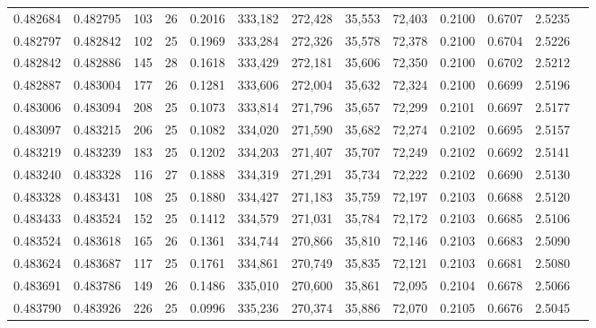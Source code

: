 \begin{tabular}{rrrrrrrrrrrrr}
0.482684 & 0.482795 & 103 &  26 &                                     0.2016 & 333,182 & 272,428 &  35,553 &  72,403 & 0.2100 & 0.6707 & 2.5235 \\
0.482797 & 0.482842 & 102 &  25 &                                     0.1969 & 333,284 & 272,326 &  35,578 &  72,378 & 0.2100 & 0.6704 & 2.5226 \\
0.482842 & 0.482886 & 145 &  28 &                                     0.1618 & 333,429 & 272,181 &  35,606 &  72,350 & 0.2100 & 0.6702 & 2.5212 \\
0.482887 & 0.483004 & 177 &  26 &                                     0.1281 & 333,606 & 272,004 &  35,632 &  72,324 & 0.2100 & 0.6699 & 2.5196 \\
0.483006 & 0.483094 & 208 &  25 &                                     0.1073 & 333,814 & 271,796 &  35,657 &  72,299 & 0.2101 & 0.6697 & 2.5177 \\
0.483097 & 0.483215 & 206 &  25 &                                     0.1082 & 334,020 & 271,590 &  35,682 &  72,274 & 0.2102 & 0.6695 & 2.5157 \\
0.483219 & 0.483239 & 183 &  25 &                                     0.1202 & 334,203 & 271,407 &  35,707 &  72,249 & 0.2102 & 0.6692 & 2.5141 \\
0.483240 & 0.483328 & 116 &  27 &                                     0.1888 & 334,319 & 271,291 &  35,734 &  72,222 & 0.2102 & 0.6690 & 2.5130 \\
0.483328 & 0.483431 & 108 &  25 &                                     0.1880 & 334,427 & 271,183 &  35,759 &  72,197 & 0.2103 & 0.6688 & 2.5120 \\
0.483433 & 0.483524 & 152 &  25 &                                     0.1412 & 334,579 & 271,031 &  35,784 &  72,172 & 0.2103 & 0.6685 & 2.5106 \\
0.483524 & 0.483618 & 165 &  26 &                                     0.1361 & 334,744 & 270,866 &  35,810 &  72,146 & 0.2103 & 0.6683 & 2.5090 \\
0.483624 & 0.483687 & 117 &  25 &                                     0.1761 & 334,861 & 270,749 &  35,835 &  72,121 & 0.2103 & 0.6681 & 2.5080 \\
0.483691 & 0.483786 & 149 &  26 &                                     0.1486 & 335,010 & 270,600 &  35,861 &  72,095 & 0.2104 & 0.6678 & 2.5066 \\
0.483790 & 0.483926 & 226 &  25 &                                     0.0996 & 335,236 & 270,374 &  35,886 &  72,070 & 0.2105 & 0.6676 & 2.5045 \\

\end{tabular}
